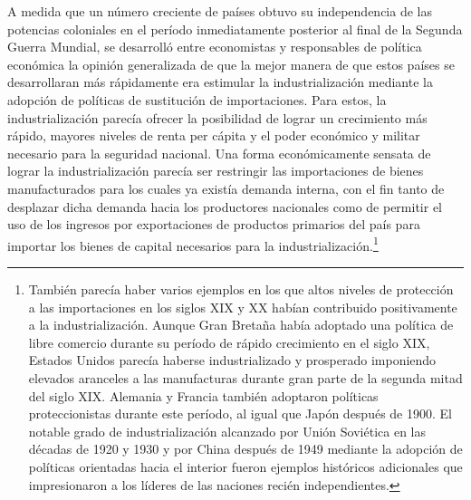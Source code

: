 \documentclass[10pt,a4paper]{article}
\begin{document}
A medida que un número creciente de países obtuvo su independencia de las potencias coloniales en el período inmediatamente posterior al final de la Segunda Guerra Mundial, se desarrolló entre economistas y responsables de política económica la opinión generalizada de que la mejor manera de que estos países se desarrollaran más rápidamente era estimular la industrialización mediante la adopción de políticas de sustitución de importaciones. Para estos, la industrialización parecía ofrecer la posibilidad de lograr un crecimiento más rápido, mayores niveles de renta per cápita y el poder económico y militar necesario para la seguridad nacional. Una forma económicamente sensata de lograr la industrialización parecía ser restringir las importaciones de bienes manufacturados para los cuales ya existía demanda interna, con el fin tanto de desplazar dicha demanda hacia los productores nacionales como de permitir el uso de los ingresos por exportaciones de productos primarios del país para importar los bienes de capital necesarios para la industrialización.\footnote{%
    También parecía haber varios ejemplos en los que altos niveles de protección a las importaciones en los siglos XIX y XX habían contribuido positivamente a la industrialización. Aunque Gran Bretaña había adoptado una política de libre comercio durante su período de rápido crecimiento en el siglo XIX, Estados Unidos parecía haberse industrializado y prosperado imponiendo elevados aranceles a las manufacturas durante gran parte de la segunda mitad del siglo XIX. Alemania y Francia también adoptaron políticas proteccionistas durante este período, al igual que Japón después de 1900. El notable grado de industrialización alcanzado por Unión Soviética en las décadas de 1920 y 1930 y por China después de 1949 mediante la adopción de políticas orientadas hacia el interior fueron ejemplos históricos adicionales que impresionaron a los líderes de las naciones recién independientes.
}
\end{document}
